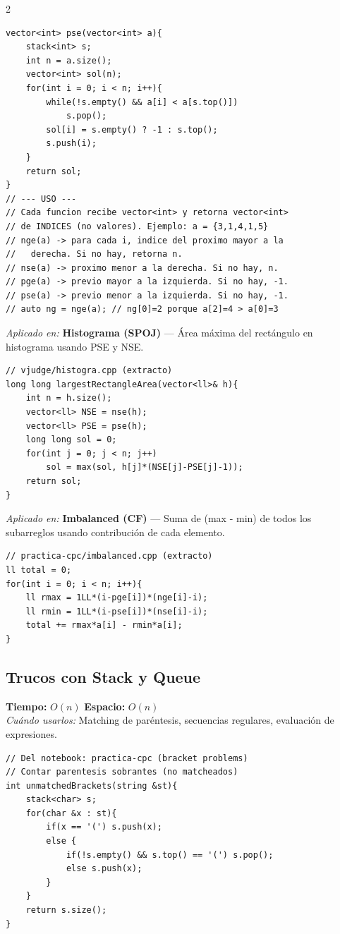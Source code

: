 \documentclass[10pt,a4paper]{article}
\begin{document}
\begin{multicols}{2}
\begin{lstlisting}
vector<int> pse(vector<int> a){
    stack<int> s;
    int n = a.size();
    vector<int> sol(n);
    for(int i = 0; i < n; i++){
        while(!s.empty() && a[i] < a[s.top()])
            s.pop();
        sol[i] = s.empty() ? -1 : s.top();
        s.push(i);
    }
    return sol;
}
// --- USO ---
// Cada funcion recibe vector<int> y retorna vector<int>
// de INDICES (no valores). Ejemplo: a = {3,1,4,1,5}
// nge(a) -> para cada i, indice del proximo mayor a la
//   derecha. Si no hay, retorna n.
// nse(a) -> proximo menor a la derecha. Si no hay, n.
// pge(a) -> previo mayor a la izquierda. Si no hay, -1.
// pse(a) -> previo menor a la izquierda. Si no hay, -1.
// auto ng = nge(a); // ng[0]=2 porque a[2]=4 > a[0]=3
\end{lstlisting}

\textit{Aplicado en:} \textbf{Histograma (SPOJ)} --- \'Area m\'axima del rect\'angulo en histograma usando PSE y NSE.

\begin{lstlisting}
// vjudge/histogra.cpp (extracto)
long long largestRectangleArea(vector<ll>& h){
    int n = h.size();
    vector<ll> NSE = nse(h);
    vector<ll> PSE = pse(h);
    long long sol = 0;
    for(int j = 0; j < n; j++)
        sol = max(sol, h[j]*(NSE[j]-PSE[j]-1));
    return sol;
}
\end{lstlisting}

\textit{Aplicado en:} \textbf{Imbalanced (CF)} --- Suma de (max - min) de todos los subarreglos usando contribuci\'on de cada elemento.

\begin{lstlisting}
// practica-cpc/imbalanced.cpp (extracto)
ll total = 0;
for(int i = 0; i < n; i++){
    ll rmax = 1LL*(i-pge[i])*(nge[i]-i);
    ll rmin = 1LL*(i-pse[i])*(nse[i]-i);
    total += rmax*a[i] - rmin*a[i];
}
\end{lstlisting}

\subsection{Trucos con Stack y Queue}
\textbf{Tiempo:} $O(n)$ \quad \textbf{Espacio:} $O(n)$\\
\textit{Cu\'ando usarlos:} Matching de par\'entesis, secuencias regulares, evaluaci\'on de expresiones.

\begin{lstlisting}
// Del notebook: practica-cpc (bracket problems)
// Contar parentesis sobrantes (no matcheados)
int unmatchedBrackets(string &st){
    stack<char> s;
    for(char &x : st){
        if(x == '(') s.push(x);
        else {
            if(!s.empty() && s.top() == '(') s.pop();
            else s.push(x);
        }
    }
    return s.size();
}


\end{lstlisting}
\end{multicols}
\end{document}
